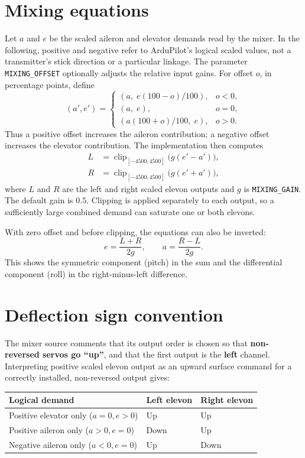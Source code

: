 \documentclass[11pt]{article}
\begin{document}
\section{Mixing equations}

Let \(a\) and \(e\) be the scaled aileron and elevator demands read by the
mixer. In the following, positive and negative refer to ArduPilot's logical
scaled values, not a transmitter's stick direction or a particular linkage.
The parameter \texttt{MIXING\_OFFSET} optionally adjusts the relative input
gains. For offset \(o\), in percentage points, define
\[
(a',e') =
\begin{cases}
(a,\;e(100-o)/100), & o < 0,\\
(a,\;e), & o = 0,\\
(a(100+o)/100,\;e), & o > 0.
\end{cases}
\]
Thus a positive offset increases the aileron contribution; a negative offset
increases the elevator contribution. The implementation then computes
\[
\begin{aligned}
L &= \operatorname{clip}_{[-4500,4500]}\bigl(g(e'-a')\bigr),\\
R &= \operatorname{clip}_{[-4500,4500]}\bigl(g(e'+a')\bigr),
\end{aligned}
\]
where \(L\) and \(R\) are the left and right scaled elevon outputs and \(g\)
is \texttt{MIXING\_GAIN}. The default gain is \(0.5\). Clipping is applied
separately to each output, so a sufficiently large combined demand can saturate
one or both elevons.

With zero offset and before clipping, the equations can also be inverted:
\[
e = \frac{L+R}{2g}, \qquad a = \frac{R-L}{2g}.
\]
This shows the symmetric component (pitch) in the sum and the differential
component (roll) in the right-minus-left difference.

\section{Deflection sign convention}

The mixer source comments that its output order is chosen so that
\textbf{non-reversed servos go ``up''}, and that the first output is the
\textbf{left} channel. Interpreting positive scaled elevon output as an upward
surface command for a correctly installed, non-reversed output gives:

\begin{center}
\begin{tabular}{@{}lll@{}}
\toprule
Logical demand & Left elevon & Right elevon\\
\midrule
Positive elevator only (\(a=0,e>0\)) & Up & Up\\
Positive aileron only (\(a>0,e=0\)) & Down & Up\\
Negative aileron only (\(a<0,e=0\)) & Up & Down\\
\bottomrule
\end{tabular}
\end{center}
\end{document}
